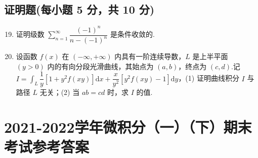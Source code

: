 \documentclass[../Main.tex]{subfiles}
\begin{document}
\section{证明题(每小题 5 分，共 10 分)}

\begin{enumerate}
    \setcounter{enumi}{18}
    \item 证明级数 \( \sum \limits_{n=1}^{\infty} \dfrac{(-1)^n}{n - (-1)^n} \) 是条件收敛的.
          \vspace{10em}

    \item 设函数 \( f(x) \) 在 \( (-\infty, +\infty) \) 内具有一阶连续导数，\( L \) 是上半平面 \( (y > 0) \) 内的有向分段光滑曲线，其始点为 \( (a, b) \)，终点为 \( (c, d) \).记 \( I = \displaystyle \int_L \dfrac{1}{y}[1 + y^2 f(xy)]\mathrm{d}x + \dfrac{x}{y^2}[y^2 f(xy) - 1]\mathrm{d}y \)，(1) 证明曲线积分 \( I \) 与路径 \( L \) 无关；(2) 当 \( ab = cd \) 时，求 \( I \) 的值.
          \vspace{10em}
\end{enumerate}
\chapter{2021-2022学年微积分（一）（下）期末考试参考答案}
\end{document}
